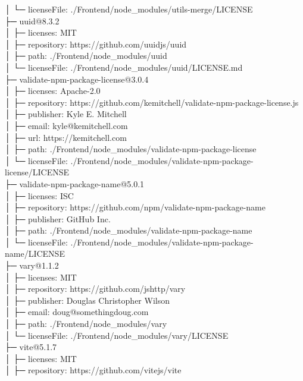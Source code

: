 \documentclass[
    paper=a4,
    twoside=false,
    parskip=half,
    listof=entryprefix,
    listof=totoc,
    index=totoc,
    bibliography=totoc,
    headsepline,
]{scrbook}
\begin{document}
    │  └─ licenseFile: ./Frontend/node\_modules/utils-merge/LICENSE\\
    ├─ uuid@8.3.2\\
    │  ├─ licenses: MIT\\
    │  ├─ repository: https://github.com/uuidjs/uuid\\
    │  ├─ path: ./Frontend/node\_modules/uuid\\
    │  └─ licenseFile: ./Frontend/node\_modules/uuid/LICENSE.md\\
    ├─ validate-npm-package-license@3.0.4\\
    │  ├─ licenses: Apache-2.0\\
    │  ├─ repository: https://github.com/kemitchell/validate-npm-package-license.js\\
    │  ├─ publisher: Kyle E. Mitchell\\
    │  ├─ email: kyle@kemitchell.com\\
    │  ├─ url: https://kemitchell.com\\
    │  ├─ path: ./Frontend/node\_modules/validate-npm-package-license\\
    │  └─ licenseFile: ./Frontend/node\_modules/validate-npm-package-license/LICENSE\\
    ├─ validate-npm-package-name@5.0.1\\
    │  ├─ licenses: ISC\\
    │  ├─ repository: https://github.com/npm/validate-npm-package-name\\
    │  ├─ publisher: GitHub Inc.\\
    │  ├─ path: ./Frontend/node\_modules/validate-npm-package-name\\
    │  └─ licenseFile: ./Frontend/node\_modules/validate-npm-package-name/LICENSE\\
    ├─ vary@1.1.2\\
    │  ├─ licenses: MIT\\
    │  ├─ repository: https://github.com/jshttp/vary\\
    │  ├─ publisher: Douglas Christopher Wilson\\
    │  ├─ email: doug@somethingdoug.com\\
    │  ├─ path: ./Frontend/node\_modules/vary\\
    │  └─ licenseFile: ./Frontend/node\_modules/vary/LICENSE\\
    ├─ vite@5.1.7\\
    │  ├─ licenses: MIT\\
    │  ├─ repository: https://github.com/vitejs/vite\\
\end{document}
